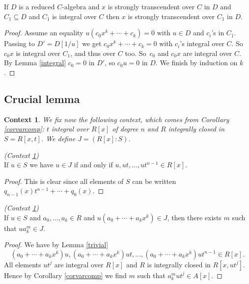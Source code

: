 \documentclass[11pt,a4paper,twoside]{article}
\newtheorem{context}[theorem]{Context}
\begin{document}
\begin{lemma}\label{transcendent}
If  $D$ is a reduced $C$-algebra and $x$ is strongly transcendent over $C$
in $D$ and  $C_1\subseteq D$ and $C_1$ is integral over $C$ then 
$x$ is
strongly transcendent over $C_1$  in $D$. 
\end{lemma}
%
\begin{proof}
Assume an equality   $u(c_0x^k+ \cdots+c_k) = 0$ with $u\in D$ and $c_i$'s in $C_1$. Passing  to $D'=D[1/u]$ we get $c_0x^k+ \cdots+c_k = 0$ with
 $c_i$'s integral over $C$. So $c_0x$ is integral over $C_1$, and thus over $C$ too.
So~$c_0$ and $c_0x$ are integral over $C$. By Lemma \ref{integral}
$c_0=0$ in $D'$, so $c_0u=0$ in $D$. We finish by induction on $k$. 
\end{proof}
%


\subsection{Crucial lemma}
\label{subsecCrulem} 

\begin{context} \label{context1}
We fix now the following context, which comes from Corollary \ref{corvarcomp}: $t$ integral over $R[x]$ of degree $n$ and $R$ integrally closed in $S=R[x,t]$.
We define $J = (R[x]:S)$.  
\end{context}


\begin{lemma}\label{trivial} \emph{(Context \ref{context1})}\\
If $u\in S$ we have $u\in J$ if and only if $u,ut,\dots,ut^{n-1}\in R[x]$.
\end{lemma}

\begin{proof}
This is clear since all elements of $S$ can be written $q_{n-1}(x)t^{n-1}+ \cdots+q_0(x)$.
\end{proof}

\begin{lemma}\label{pre13.5} \emph{(Context \ref{context1})}\\
If $u\in S$ and $a_0,\dots,a_k\in R$ and $u(a_0+ \cdots+a_kx^k)\in J$, then there exists $m$ such that $ua_k^m\in J$.
\end{lemma}

\begin{proof}
We have by Lemma \ref{trivial}
$$
(a_0+ \cdots+a_kx^k)u, (a_0+ \cdots+a_kx^k)ut, \dots, (a_0+ \cdots+a_kx^k)ut^{n-1}\in R[x].
$$
All elements $ut^j$ are integral over $R[x]$ and $R$ is integrally closed in $R[x,ut^j]$.
Hence by Corollary \ref{corvarcomp} we find $m$ such that $a_k^m ut^j \in A[x]$.
\end{proof}
\end{document}
